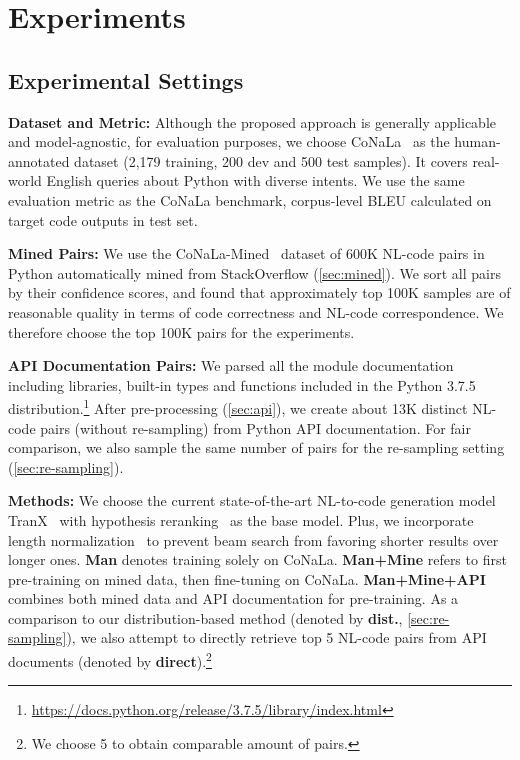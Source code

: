 \documentclass[11pt,a4paper]{article}
\begin{document}
\section{Experiments}
\label{sec:exp}

\subsection{Experimental Settings}
\noindent \textbf{Dataset and Metric:}
Although the proposed approach is generally applicable and model-agnostic, for evaluation purposes, we choose CoNaLa~\cite{yin2018mining} as the human-annotated dataset (2,179 training, 200 dev and 500 test samples). 
It covers real-world English queries about Python with diverse intents.
We use the same evaluation metric as the CoNaLa benchmark, corpus-level BLEU calculated on target code outputs in test set.

\noindent \textbf{Mined Pairs:}
We use the CoNaLa-Mined~\cite{yin2018mining} dataset of 600K NL-code pairs in Python automatically mined from StackOverflow (\autoref{sec:mined}).
We sort all pairs by their confidence scores, and found that approximately top 100K samples are of reasonable quality in terms of code correctness and NL-code correspondence.
We therefore choose the top 100K pairs for the experiments.

\noindent \textbf{API Documentation Pairs:} 
We parsed all the module documentation including libraries, built-in types and functions included in the Python 3.7.5 distribution.\footnote{\url{https://docs.python.org/release/3.7.5/library/index.html}}
After pre-processing (\autoref{sec:api}), we create about 13K distinct NL-code pairs (without re-sampling) from Python API documentation.
For fair comparison, we also sample the same number of pairs for the re-sampling setting (\autoref{sec:re-sampling}).

\noindent \textbf{Methods:}
We choose the current state-of-the-art NL-to-code generation model TranX~\cite{yin-neubig-2018-tranx} with hypothesis reranking~\cite{yin-neubig-2019-reranking} as the base model.
Plus, we incorporate length normalization~\cite{cho-2014-learning} to prevent beam search from favoring shorter results over longer ones.
\textbf{Man} denotes training solely on CoNaLa.
\textbf{Man+Mine} refers to first pre-training on mined data, then fine-tuning on CoNaLa.
\textbf{Man+Mine+API} combines both mined data and API documentation for pre-training.
As a comparison to our distribution-based method (denoted by \textbf{dist.}, \autoref{sec:re-sampling}), we also attempt to directly retrieve top 5 NL-code pairs from API documents (denoted by \textbf{direct}).\footnote{We choose 5 to obtain comparable amount of pairs.}
\end{document}
